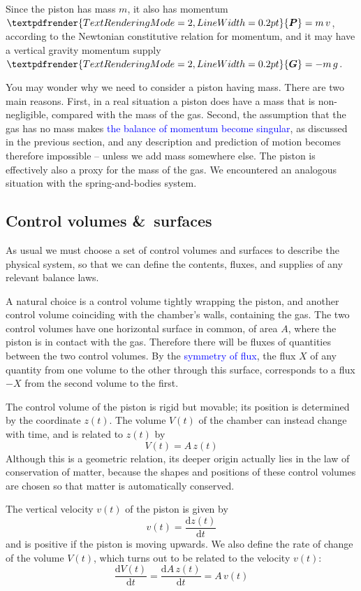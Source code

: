 \documentclass[a4paper,12pt,%
onecolumn,oneside,%
british%
]{memoir}
\newcommand*{\amp}{\&}
\renewcommand*{\bm}[1]{\textpdfrender{TextRenderingMode=2,LineWidth=0.2pt}{\boldsymbol{#1}}}
\newcommand*{\di}{\mathrm{d}}%
\renewcommand*{\|}[1][]{\nonscript\:#1\vert\nonscript\:\mathopen{}}
\newcommand*{\sect}{\S}%
\renewcommand*{\autoref}[2]{\sidepar{\vspace{-1ex}\footnotesize{\color{blue}\faIcon{%
angle-right%
}\enspace\sect~\ref{#1} page~\pageref{#1}}}\textcolor{blue}{#2}}
\newcommand*{\yM}{m}%
\newcommand*{\yP}{\bm{P}}
\newcommand*{\yG}{\bm{G}}
\begin{document}
Since the piston has mass $\yM$, it also has momentum $\yP=\yM\,v$, according to the Newtonian constitutive relation for momentum, and it may have a vertical gravity momentum supply $\yG = -\yM\,g$.

You may wonder why we need to consider a piston having mass. There are two main reasons. First, in a real situation a piston does have a mass that is non-negligible, compared with the mass of the gas. Second, the assumption that the gas has no mass makes \autoref{sec:further_idealgas}{the balance of momentum become singular}, as discussed in the previous section, and any description and prediction of motion becomes therefore impossible -- unless we add mass somewhere else. The piston is effectively also a proxy for the mass of the gas. We encountered an analogous situation with the spring-and-bodies system.

\subsection{Control volumes \amp\ surfaces}
\label{sec:idealgas_ex_control}

As usual we must choose a set of control volumes and surfaces to describe the physical system, so that we can define the contents, fluxes, and supplies of any relevant balance laws.

A natural choice is a control volume tightly wrapping the piston, and another control volume coinciding with the chamber's walls, containing the gas. The two control volumes have one horizontal surface in common, of area $A$, where the piston is in contact with the gas. Therefore there will be fluxes of quantities between the two control volumes. By the \autoref{def:symmetryflux}{symmetry of flux}, the flux $X$ of any quantity from one volume to the other through this surface, corresponds to a flux $-X$ from the second volume to the first.

The control volume of the piston is rigid but movable; its position is determined by the coordinate $z(t)$. The volume $V(t)$ of the chamber can instead change with time, and is related to $z(t)$ by
\begin{equation}\label{eq:Vz_gas}
  V(t) = A\,z(t)
\end{equation}
Although this is a geometric relation, its deeper origin actually lies in the law of conservation of matter, because the shapes and positions of these control volumes are chosen so that matter is automatically conserved.

The vertical velocity $v(t)$ of the piston is given by
\begin{equation*}
  v(t) = \frac{\di z(t)}{\di t}
\end{equation*}
and is positive if the piston is moving upwards. We also define the rate of change of the volume $V(t)$, which turns out to be related to the velocity $v(t)$:
\begin{equation}\label{eq:Vv_gas}
  \frac{\di V(t)}{\di t} = \frac{\di A\, z(t)}{\di t} = A\,v(t)
\end{equation}
\end{document}
